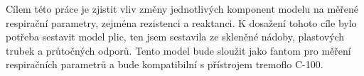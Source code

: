 Cílem této práce je zjistit vliv změny jednotlivých komponent modelu na měřené respirační parametry, zejména rezistenci a reaktanci. 
K dosažení tohoto cíle bylo potřeba sestavit model plic, ten jsem sestavila ze skleněné nádoby, plastových trubek a průtočných odporů. Tento model bude sloužit jako fantom pro měření respiračních parametrů a bude kompatibilní s přístrojem tremoflo C-100.
